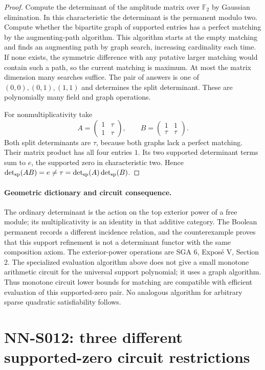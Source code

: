 \begin{proof}
Compute the determinant of the amplitude matrix over $\mathbb F_2$
by Gaussian elimination. In this characteristic the determinant
is the permanent modulo two. Compute whether the bipartite graph
of supported entries has a perfect matching by the augmenting-path
algorithm. This algorithm starts at the empty matching and finds
an augmenting path by graph search, increasing cardinality each
time. If none exists, the symmetric difference with any putative
larger matching would contain such a path, so the current matching
is maximum. At most the matrix dimension many searches suffice.
The pair of answers is one of $(0,0),(0,1),(1,1)$ and determines
the split determinant. These are polynomially many field and
graph operations.

For nonmultiplicativity take
\[
 A=\begin{pmatrix}1&\tau\\1&\tau\end{pmatrix},\qquad
 B=\begin{pmatrix}1&1\\\tau&\tau\end{pmatrix}.
\]
Both split determinants are $\tau$, because both graphs lack a
perfect matching. Their matrix product has all four entries $1$.
Its two supported determinant terms sum to $e$, the supported
zero in characteristic two. Hence
$\det_{\rm sp}(AB)=e\ne\tau=
\det_{\rm sp}(A)\det_{\rm sp}(B)$.
\end{proof}

\paragraph{Geometric dictionary and circuit consequence.}
The ordinary determinant is the action on the top exterior power
of a free module; its multiplicativity is an identity in that
additive category. The Boolean permanent records a different
incidence relation, and the counterexample proves that this
support refinement is not a determinant functor with the same
composition axiom. The exterior-power operations are SGA 6,
Expos\'e V, Section 2. The specialized evaluation algorithm above
does not give a small monotone arithmetic circuit for the
universal support polynomial; it uses a graph algorithm. Thus
monotone circuit lower bounds for matching are compatible with
efficient evaluation of this supported-zero pair. No analogous
algorithm for arbitrary sparse quadratic satisfiability follows.


\section{NN-S012: three different supported-zero circuit restrictions}
\label{sec:root-circuit-models}

